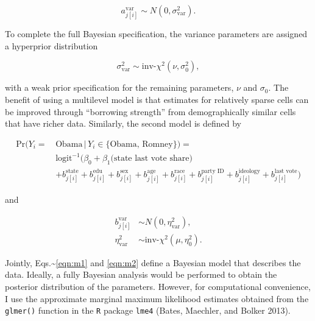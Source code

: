 \begin{equation*}
a^{\text{var}}_{j[i]}\sim N(0,\sigma^2_\text{var}).
\end{equation*}

\noindent To complete the full Bayesian specification, the variance
parameters are assigned a hyperprior distribution

\begin{equation*}\sigma^2_\text{var}\sim \text{inv-}\chi^2(\nu, \sigma_0^2),
\end{equation*}

\noindent with a weak prior specification for the remaining parameters,
\(\nu\) and \(\sigma_0\). The benefit of using a multilevel model is
that estimates for relatively sparse cells can be improved through
``borrowing strength'' from demographically similar cells that have
richer data. Similarly, the second model is defined by

\begin{align}  \label{eqn:m2}
  \text{Pr}(Y_i = \, &\text{Obama} \, |\, Y_i\in\{\text{Obama, Romney}\})=\nonumber\\
  &\text{logit}^{-1}\big(\beta_0+ \beta_1\text{(state last vote share)} \\
  & + b^{\text{state}}_{j[i]}+b^{\text{edu}}_{j[i]}+b^{\text{sex}}_{j[i]}+b^{\text{age}}_{j[i]}
  +b^{\text{race}}_{j[i]}+b^{\text{party ID}}_{j[i]} +
  b^{\text{ideology}}_{j[i]} + b^{\text{last vote}}_{j[i]}
 \big)\nonumber
\end{align}

\noindent and

\begin{align*}
  b^{\text{var}}_{j[i]}&\sim N(0,\eta^2_\text{var}),\\
  \eta^2_\text{var}&\sim \text{inv-}\chi^2(\mu, \eta_0^2).
  \end{align*}

Jointly, Eqs.\textasciitilde{}\eqref{eqn:m1} and \eqref{eqn:m2} define a
Bayesian model that describes the data. Ideally, a fully Bayesian
analysis would be performed to obtain the posterior distribution of the
parameters. However, for computational convenience, I use the
approximate marginal maximum likelihood estimates obtained from the
\texttt{glmer()} function in the \texttt{R} package \texttt{lme4}
(Bates, Maechler, and Bolker 2013).


